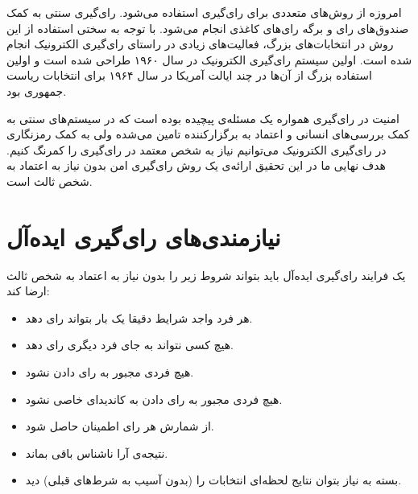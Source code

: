 \par
امروزه از روش‌های متعددی برای رای‌گیری استفاده می‌شود. رای‌گیری سنتی به کمک صندوق‌های رای‌ و برگه‌ رای‌های کاغذی انجام می‌شود. با توجه به سختی استفاده از این روش در انتخابات‌های بزرگ، فعالیت‌های زیادی در راستای رای‌گیری الکترونیک انجام شده است. اولین سیستم رای‌گیری الکترونیک در سال ۱۹۶۰ طراحی شده است و اولین استفاده‌ بزرگ از آن‌ها در چند ایالت آمریکا در سال ۱۹۶۴ برای انتخابات ریاست جمهوری بود. 

\par
امنیت در رای‌گیری همواره یک مسئله‌ی پیچیده بوده است که در سیستم‌های سنتی به کمک بررسی‌های انسانی و اعتماد به برگزارکننده تامین می‌شده ولی به کمک رمزنگاری در رای‌گیری الکترونیک می‌توانیم نیاز به شخص معتمد در رای‌گیری را کمرنگ کنیم. هدف نهایی ما در این تحقیق ارائه‌ی یک روش رای‌گیری امن بدون نیاز به اعتماد به شخص ثالث است. 
\section{نیازمندی‌های رای‌گیری ایده‌آل}

یک فرایند‌ رای‌گیری ایده‌آل باید بتواند شروط زیر را بدون نیاز به اعتماد به شخص ثالث ارضا کند:
\begin{itemize}
	\item 
	هر فرد واجد شرایط دقیقا یک بار بتواند رای دهد.
	\item 
	هیچ کسی نتواند به جای فرد دیگری رای دهد.
	\item 
  	هیچ فردی مجبور به رای دادن نشود.
  	\item 
  	هیچ فردی مجبور به رای دادن به کاندیدای خاصی نشود.
  	\item 
  	از شمارش هر رای اطمینان حاصل شود.
  	\item 
    نتیجه‌ی آرا ناشناس  باقی بماند. 
  	\item 
  	بسته به نیاز بتوان نتایج لحظه‌ای انتخابات را (بدون آسیب به شرط‌های قبلی) دید.
\end{itemize}

